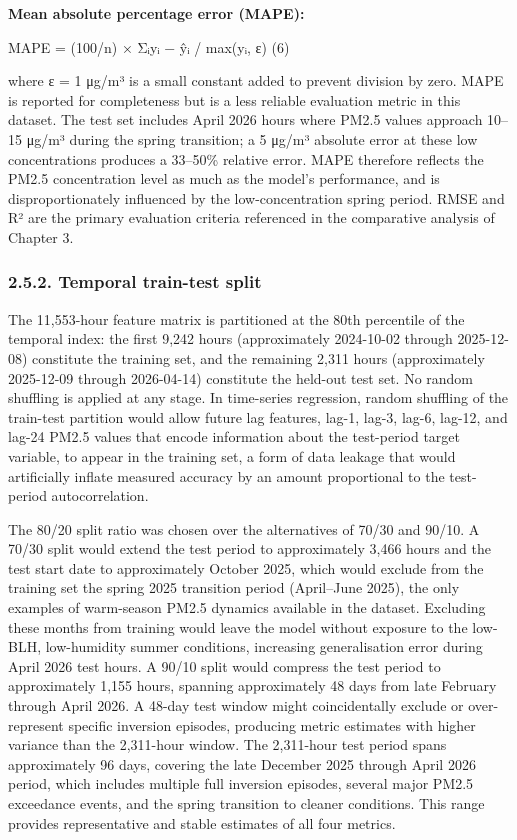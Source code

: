 \textbf{Mean absolute percentage error (MAPE):}

MAPE = (100/n) × Σᵢ\textbar yᵢ − ŷᵢ\textbar{} / max(\textbar yᵢ\textbar, ε) (6)

where ε = 1 μg/m³ is a small constant added to prevent division by zero. MAPE is reported for completeness but is a less reliable evaluation metric in this dataset. The test set includes April 2026 hours where PM2.5 values approach 10--15 μg/m³ during the spring transition; a 5 μg/m³ absolute error at these low concentrations produces a 33--50\% relative error. MAPE therefore reflects the PM2.5 concentration level as much as the model's performance, and is disproportionately influenced by the low-concentration spring period. RMSE and R² are the primary evaluation criteria referenced in the comparative analysis of Chapter 3.

\subsubsection{2.5.2. Temporal train-test split}\label{temporal-train-test-split}

The 11,553-hour feature matrix is partitioned at the 80th percentile of the temporal index: the first 9,242 hours (approximately 2024-10-02 through 2025-12-08) constitute the training set, and the remaining 2,311 hours (approximately 2025-12-09 through 2026-04-14) constitute the held-out test set. No random shuffling is applied at any stage. In time-series regression, random shuffling of the train-test partition would allow future lag features, lag-1, lag-3, lag-6, lag-12, and lag-24 PM2.5 values that encode information about the test-period target variable, to appear in the training set, a form of data leakage that would artificially inflate measured accuracy by an amount proportional to the test-period autocorrelation.

The 80/20 split ratio was chosen over the alternatives of 70/30 and 90/10. A 70/30 split would extend the test period to approximately 3,466 hours and the test start date to approximately October 2025, which would exclude from the training set the spring 2025 transition period (April--June 2025), the only examples of warm-season PM2.5 dynamics available in the dataset. Excluding these months from training would leave the model without exposure to the low-BLH, low-humidity summer conditions, increasing generalisation error during April 2026 test hours. A 90/10 split would compress the test period to approximately 1,155 hours, spanning approximately 48 days from late February through April 2026. A 48-day test window might coincidentally exclude or over-represent specific inversion episodes, producing metric estimates with higher variance than the 2,311-hour window. The 2,311-hour test period spans approximately 96 days, covering the late December 2025 through April 2026 period, which includes multiple full inversion episodes, several major PM2.5 exceedance events, and the spring transition to cleaner conditions. This range provides representative and stable estimates of all four metrics.

